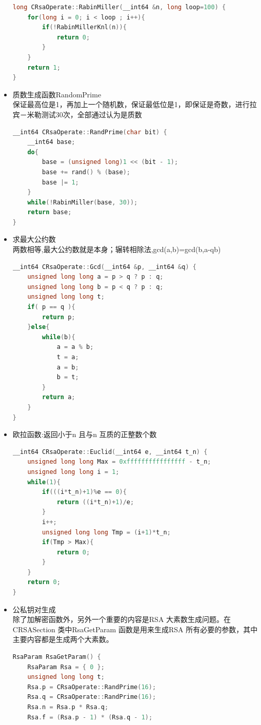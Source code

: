 \documentclass[UTF8,a4paper,10pt]{ctexart}
\begin{document}
\begin{itemize}
\begin{lstlisting}[language = c++]
long CRsaOperate::RabinMiller(__int64 &n, long loop=100) {
    for(long i = 0; i < loop ; i++){
        if(!RabinMillerKnl(n)){
            return 0;
        }
    }
    return 1;
}
  \end{lstlisting}
  \item 质数生成函数RandomPrime\\ 
  保证最高位是1，再加上一个随机数，保证最低位是1，即保证是奇数，进行拉宾－米勒测试30次，全部通过认为是质数
  \begin{lstlisting}[language = C++]
__int64 CRsaOperate::RandPrime(char bit) {
    __int64 base;
    do{
        base = (unsigned long)1 << (bit - 1);
        base += rand() % (base);
        base |= 1;
    }
    while(!RabinMiller(base, 30));
    return base;
}
  \end{lstlisting}
  \item 求最大公约数\\
  两数相等,最大公约数就是本身；辗转相除法,gcd(a,b)=gcd(b,a-qb)
  \begin{lstlisting}[language = C++]
__int64 CRsaOperate::Gcd(__int64 &p, __int64 &q) {
    unsigned long long a = p > q ? p : q;
    unsigned long long b = p < q ? p : q;
    unsigned long long t;
    if( p == q ){
        return p;
    }else{
        while(b){
            a = a % b;
            t = a;
            a = b;
            b = t;
        }
        return a;
    }
}
  \end{lstlisting}
  \item 欧拉函数:返回小于n 且与n 互质的正整数个数
  \begin{lstlisting}[language = C++]
__int64 CRsaOperate::Euclid(__int64 e, __int64 t_n) { 
    unsigned long long Max = 0xffffffffffffffff - t_n;
    unsigned long long i = 1;
    while(1){
        if(((i*t_n)+1)%e == 0){
            return ((i*t_n)+1)/e;
        }
        i++;
        unsigned long long Tmp = (i+1)*t_n;
        if(Tmp > Max){
            return 0;
        }
    }
    return 0;
}    
  \end{lstlisting}
  \item 公私钥对生成\\
  除了加解密函数外，另外一个重要的内容是RSA 大素数生成问题。在CRSASection 类中RsaGetParam 函数是用来生成RSA 所有必要的参数，其中主要内容都是生成两个大素数。
  \begin{lstlisting}[language = C++]
RsaParam RsaGetParam() {
    RsaParam Rsa = { 0 };
    unsigned long long t;
    Rsa.p = CRsaOperate::RandPrime(16);
    Rsa.q = CRsaOperate::RandPrime(16);
    Rsa.n = Rsa.p * Rsa.q;
    Rsa.f = (Rsa.p - 1) * (Rsa.q - 1);

\end{lstlisting}
\end{itemize}
\end{document}
